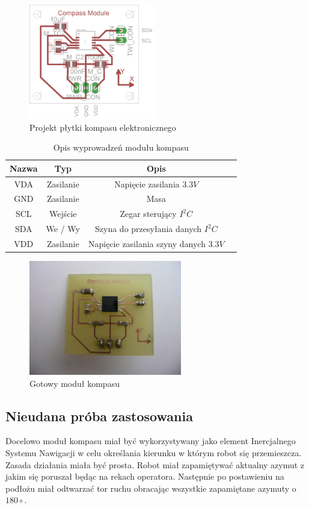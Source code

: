 \begin{figure}[!ht]
 \centering
 \includegraphics[height=50mm]{../images/ch04/mmc2120mgpcb.png}
 \caption{Projekt płytki kompasu elektronicznego}
 \label{fig:MMC2120Pcb}
\end{figure}

\begin{table}[hb]
  \centering
  \caption{Opis wyprowadzeń modułu kompasu}
  \begin{tabular}{ | c | c | c | p{1.75cm} |} \hline
    Nazwa & Typ & Opis \\ \hline
    VDA & Zasilanie & Napięcie zasilania $3.3V$ \\
    GND & Zasilanie & Masa \\
    SCL & Wejście & Zegar sterujący $I^{2}C$ \\
    SDA & We / Wy & Szyna do przesyłania danych $I^{2}C$ \\
    VDD & Zasilanie & Napięcie zasilania szyny danych $3.3V$ \\ \hline
  \end{tabular}
  \label{tab:MMC2120ModOut}
\end{table}

\begin{figure}[!ht]
 \centering
 \includegraphics[height=50mm]{../images/ch04/compassmodule.jpg}
 \caption{Gotowy moduł kompasu}
 \label{fig:L3G4200DModule}
\end{figure}

\subsection{Nieudana próba zastosowania}
Docelowo moduł kompasu miał być wykorzystywany jako element Inercjalnego Systemu Nawigacji w celu określania kierunku w którym robot się przemieszcza. Zasada działania miała być prosta. Robot miał zapamiętywać aktualny azymut z jakim się poruszał będąc na rekach operatora. Następnie po postawieniu na podłożu miał odtwarzać tor ruchu obracając wszystkie zapamiętane azymuty o $180\circ$. 

